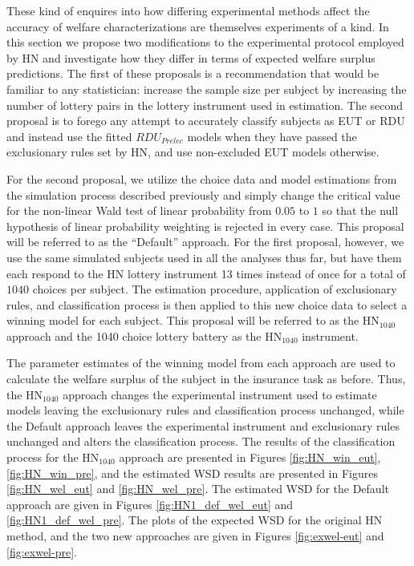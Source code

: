 \documentclass[../main.tex]{subfiles}
\begin{document}
These kind of enquires into how differing experimental methods affect the accuracy of welfare characterizations are themselves experiments of a kind.
In this section we propose two modifications to the experimental protocol employed by HN and investigate how they differ in terms of expected welfare surplus predictions.
The first of these proposals is a recommendation that would be familiar to any statistician: increase the sample size per subject by increasing the number of lottery pairs in the lottery instrument used in estimation.
The second proposal is to forego any attempt to accurately classify subjects as EUT or RDU and instead use the fitted $\mathit{RDU_{Prelec}}$ models when they have passed the exclusionary rules set by HN, and use non-excluded EUT models otherwise.

For the second proposal, we utilize the choice data and model estimations from the simulation process described previously and simply change the critical value for the non-linear Wald test of linear probability from $0.05$ to $1$ so that the null hypothesis of linear probability weighting is rejected in every case.
This proposal will be referred to as the \enquote{Default} approach.
For the first proposal, however, we use the same simulated subjects used in all the analyses thus far, but have them each respond to the HN lottery instrument 13 times instead of once for a total of $1040$ choices per subject.
The estimation procedure, application of exclusionary rules, and classification process is then applied to this new choice data to select a winning model for each subject.
This proposal will be referred to as the $\text{HN}_{1040}$ approach and the 1040 choice lottery battery as the $\text{HN}_{1040}$ instrument.

The parameter estimates of the winning model from each approach are used to calculate the welfare surplus of the subject in the insurance task as before.
Thus, the $\text{HN}_{1040}$ approach changes the experimental instrument used to estimate models leaving the exclusionary rules and classification process unchanged, while the Default approach leaves the experimental instrument and exclusionary rules unchanged and alters the classification process.
The results of the classification process for the $\text{HN}_{1040}$ approach are presented in Figures \ref{fig:HN_win_eut}, \ref{fig:HN_win_pre}, and the estimated WSD results are presented in Figures \ref{fig:HN_wel_eut} and \ref{fig:HN_wel_pre}.
The estimated WSD for the Default approach are given in Figures \ref{fig:HN1_def_wel_eut} and \ref{fig:HN1_def_wel_pre}.
The plots of the expected WSD for the original HN method, and the two new approaches are given in Figures \ref{fig:exwel-eut} and \ref{fig:exwel-pre}.
\end{document}

